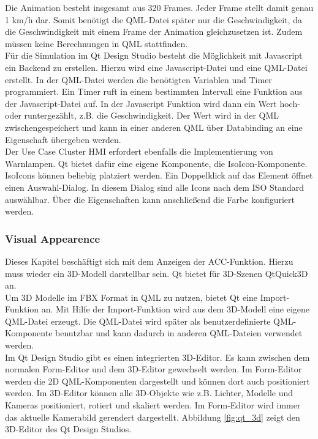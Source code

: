 Die Animation besteht insgesamt aus 320 Frames. Jeder Frame stellt damit genau 1 \si[per-mode=symbol]{\kilo\meter\per\hour} dar. Somit benötigt die QML-Datei später nur die Geschwindigkeit, da die Geschwindigkeit mit einem Frame der Animation gleichzusetzen ist. Zudem müssen keine Berechnungen in QML stattfinden.\\

Für die Simulation im Qt Design Studio besteht die Möglichkeit mit Javascript ein Backend zu erstellen. Hierzu wird eine Javascript-Datei und eine QML-Datei erstellt. In der QML-Datei werden die benötigten Variablen und Timer programmiert. Ein Timer ruft in einem bestimmten Intervall eine Funktion aus der Javascript-Datei auf. In der Javascript Funktion wird dann ein Wert hoch- oder runtergezählt, z.B. die Geschwindigkeit. Der Wert wird in der QML zwischengespeichert und kann in einer anderen QML über Databinding an eine Eigenschaft übergeben werden.\\

Der Use Case Cluster HMI erfordert ebenfalls die Implementierung von Warnlampen. Qt bietet dafür eine eigene Komponente, die IsoIcon-Komponente. IsoIcons können beliebig platziert werden. Ein Doppelklick auf das Element öffnet einen Auswahl-Dialog. In diesem Dialog sind alle Icons nach dem ISO Standard auswählbar. Über die Eigenschaften kann anschließend die Farbe konfiguriert werden.\\

\subsubsection{Visual Appearence}
Dieses Kapitel beschäftigt sich mit dem Anzeigen der \ac{ACC}-Funktion. Hierzu muss wieder ein 3D-Modell darstellbar sein. Qt bietet für 3D-Szenen QtQuick3D an. \\

Um 3D Modelle im FBX Format in QML zu nutzen, bietet Qt eine Import-Funktion an. Mit Hilfe der Import-Funktion wird aus dem 3D-Modell eine eigene QML-Datei erzeugt. Die QML-Datei wird später als benutzerdefinierte QML-Komponente benutzbar und kann dadurch in anderen QML-Dateien verwendet werden.\\

Im Qt Design Studio gibt es einen integrierten 3D-Editor. Es kann zwischen dem normalen Form-Editor und dem 3D-Editor gewechselt werden. Im Form-Editor werden die 2D QML-Komponenten dargestellt und können dort auch positioniert werden. Im 3D-Editor können alle 3D-Objekte wie z.B. Lichter, Modelle und Kameras positioniert, rotiert und skaliert werden. Im Form-Editor wird immer das aktuelle Kamerabild gerendert dargestellt. Abbildung \ref{fig:qt_3d} zeigt den 3D-Editor des Qt Design Studios.\\ 

